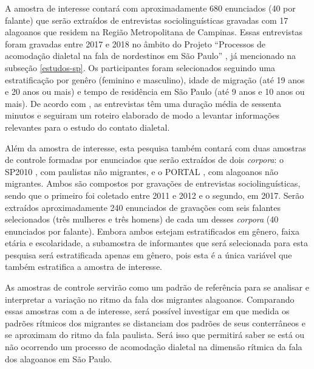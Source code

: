 \documentclass[
		a4paper,	%
		12pt,		%
		]{article}	%
\begin{document}
	A amostra de interesse contará com aproximadamente 680 enunciados (40 por
	falante) que serão extraídos de entrevistas sociolinguísticas gravadas com
	17 alagoanos que residem na Região Metropolitana de Campinas. Essas
	entrevistas foram gravadas entre 2017 e 2018 no âmbito do Projeto
	\enquote{Processos de acomodação dialetal na fala de nordestinos em São
	Paulo} \citep{Oushiro2018}, já mencionado na subseção \ref{estudos-sp}.
	Os participantes foram selecionados seguindo uma estratificação por genêro
	(feminino e masculino), idade de migração (até 19 anos e 20 anos ou mais) e
	tempo de residência em São Paulo (até 9 anos e 10 anos ou mais). De acordo
	com \citet{Oushiro2018}, as entrevistas têm uma duração média de sessenta
	minutos e seguiram um roteiro elaborado de modo a levantar informações
	relevantes para o estudo do contato dialetal.

	Além da amostra de interesse, esta pesquisa também contará com duas amostras
	de controle formadas por enunciados que serão extraídos de dois
	\emph{corpora}: o SP2010 \citep{Mendes.Oushiro2012}, com paulistas não
	migrantes, e o PORTAL \citep{Oliveira2017}, com alagoanos não migrantes.
	Ambos são compostos por gravações de entrevistas sociolinguísticas, sendo
	que o primeiro foi coletado entre 2011 e 2012 e o segundo, em 2017. Serão
	extraídos aproximadamente 240 enunciados de gravações com seis falantes
	selecionados (três mulheres e três homens) de cada um desses \emph{corpora}
	(40 enunciados por falante). Embora ambos estejam estratificados em gênero,
	faixa etária e escolaridade, a subamostra de informantes que será
	selecionada para esta pesquisa será estratificada apenas em gênero, pois
	esta é a única variável que também estratifica a amostra de interesse.

	As amostras de controle servirão como um padrão de referência para se
	analisar e interpretar a variação no ritmo da fala dos migrantes alagoanos.
	Comparando essas amostras com a de interesse, será possível investigar em
	que medida os padrões rítmicos dos migrantes se distanciam dos padrões de
	seus conterrâneos e se aproximam do ritmo da fala paulista. Será isso que
	permitirá saber se está ou não ocorrendo um processo de acomodação dialetal
	na dimensão rítmica da fala dos alagoanos em São Paulo.
	
		
\end{document}

